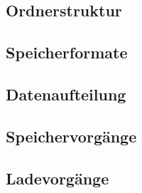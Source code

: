 \subsection{Ordnerstruktur}

\subsection{Speicherformate}

\subsection{Datenaufteilung}

\subsection{Speichervorgänge}

\subsection{Ladevorgänge}
